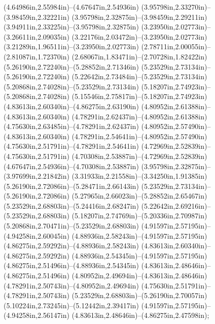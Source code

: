 (4.64986in,2.55984in)--(4.67647in,2.54936in) (3.95798in,2.33270in)--(3.98459in,2.32221in) (3.95798in,2.32875in)--(3.98459in,2.29211in) (3.94911in,2.33225in)--(3.95798in,2.32875in) (3.23950in,2.02773in)--(3.26611in,2.09035in) (3.22176in,2.03472in)--(3.23950in,2.02773in) (3.21289in,1.96511in)--(3.23950in,2.02773in) (2.78711in,2.00055in)--(2.81087in,1.72370in) (2.68067in,1.83471in)--(2.70728in,1.82422in) (5.26190in,2.72240in)--(5.28852in,2.71346in) (5.23529in,2.73134in)--(5.26190in,2.72240in) (5.22642in,2.73484in)--(5.23529in,2.73134in) (5.20868in,2.74028in)--(5.23529in,2.73134in) (5.18207in,2.74923in)--(5.20868in,2.74028in) (5.15546in,2.75817in)--(5.18207in,2.74923in) (4.83613in,2.60340in)--(4.86275in,2.63190in) (4.80952in,2.61388in)--(4.83613in,2.60340in) (4.78291in,2.62437in)--(4.80952in,2.61388in) (4.75630in,2.63485in)--(4.78291in,2.62437in) (4.80952in,2.57490in)--(4.83613in,2.60340in) (4.78291in,2.54641in)--(4.80952in,2.57490in) (4.75630in,2.51791in)--(4.78291in,2.54641in) (4.72969in,2.52839in)--(4.75630in,2.51791in) (4.70308in,2.53887in)--(4.72969in,2.52839in) (4.67647in,2.54936in)--(4.70308in,2.53887in) (3.95798in,2.32875in)--(3.97699in,2.21842in) (3.31933in,2.21558in)--(3.34250in,1.91385in) (5.26190in,2.72086in)--(5.28471in,2.66143in) (5.23529in,2.73134in)--(5.26190in,2.72086in) (5.27965in,2.66023in)--(5.28852in,2.65467in) (5.23529in,2.68803in)--(5.24416in,2.68247in) (5.22642in,2.69216in)--(5.23529in,2.68803in) (5.18207in,2.74769in)--(5.20336in,2.70987in) (5.20868in,2.70471in)--(5.23529in,2.68803in) (4.91597in,2.57195in)--(4.94258in,2.60045in) (4.88936in,2.58243in)--(4.91597in,2.57195in) (4.86275in,2.59292in)--(4.88936in,2.58243in) (4.83613in,2.60340in)--(4.86275in,2.59292in) (4.88936in,2.54345in)--(4.91597in,2.57195in) (4.86275in,2.51496in)--(4.88936in,2.54345in) (4.83613in,2.48646in)--(4.86275in,2.51496in) (4.80952in,2.49694in)--(4.83613in,2.48646in) (4.78291in,2.50743in)--(4.80952in,2.49694in) (4.75630in,2.51791in)--(4.78291in,2.50743in) (5.23529in,2.68803in)--(5.26190in,2.70057in) (5.10224in,2.73245in)--(5.12442in,2.39417in) (4.91597in,2.57195in)--(4.94258in,2.56147in) (4.83613in,2.48646in)--(4.86275in,2.47598in);

